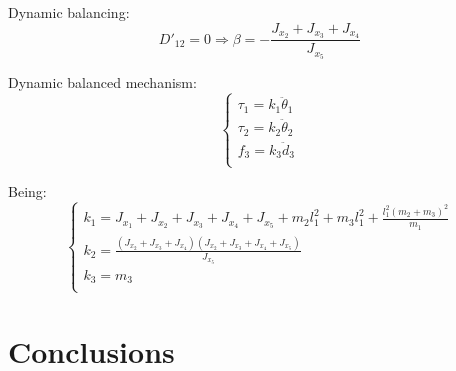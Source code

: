 \documentclass[a4paper,11pt,brazil,fleqn]{article}
\begin{document}
Dynamic balancing:
\begin{equation}
D'_{12} = 0 \Rightarrow \beta = -\frac{J_{x_2}+J_{x_3}+J_{x_4}}{J_{x_5}}
\end{equation}

Dynamic balanced mechanism:
\begin{equation}
\begin{cases}
\tau_1 = k_1 \ddot{\theta}_1 \\
\tau_2 = k_2 \ddot{\theta}_2 \\
f_3 = k_3 \ddot{d}_3 \\
\end{cases}
\end{equation}

Being:
\begin{equation}
\begin{cases}
k_1 = J_{x_1} + J_{x_2} + J_{x_3} + J_{x_4} + J_{x_5} + m_2 l_1^2 + m_3 l_1^2 + \frac{l_1^2 (m_2 + m_3)^2}{m_1} \\
k_2 = \frac{(J_{x_2}+J_{x_3}+J_{x_4})(J_{x_2}+J_{x_3}+J_{x_4}+J_{x_5})}{J_{x_5}} \\
k_3 = m_3 \\
\end{cases}
\end{equation}



\section{Conclusions}\label{S04}






{} 



\end{document}
